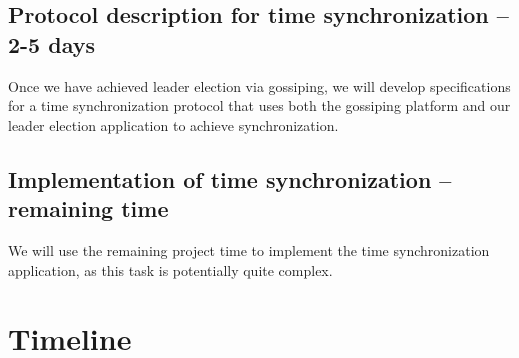 \documentclass[11pt,
  a4paper,
  ngerman,
  BCOR=7mm
]{scrartcl}
\newcommand*{\ExtractCoordinate}[1]{\path (#1); \pgfgetlastxy{\XCoord}{\YCoord};}%
\begin{document}
\subsection*{Protocol description for time synchronization -- 2-5 days}
\label{sub:protocol_time_synch}
Once we have achieved leader election via gossiping, we will develop
specifications for a time synchronization protocol that uses both the
gossiping platform and our leader election application to achieve
synchronization.

\subsection*{Implementation of time synchronization -- remaining time}
\label{sub:implementation_time_synchronization}
We will use the remaining project time to implement the time
synchronization application, as this task is potentially quite complex.

\newpage

\section*{Timeline}
\label{sec:timeline}
\newcommand{\timeunit}{Weeks}
\pgfmathsetmacro{\timenodewidth}{2cm}
\setcounter{itemnumber}{0}
\newcommand{\lastnode}{n-0}

\newcommand{\timeentry}[2]{%
\stepcounter{itemnumber}
\node[below right,minimum width=\timenodewidth] (n-\theitemnumber) at (\lastnode.south west) {#2};
\node[right] at (n-\theitemnumber.east) {};

\edef\lastnode{n-\theitemnumber}

\expandafter\edef\csname nodetime\theitemnumber \endcsname{#1}
}

\newcommand{\drawtimeline}{%
    \draw[very thick,-latex] (0,0) -- ($(\lastnode.south west)-(\scaleitemseparation,0)+(0,-1)$);
    \ExtractCoordinate{n-\theitemnumber.south}
    \pgfmathsetmacro{\yposition}{\YCoord/28.452755}
    \foreach \x in {1,...,\theitemnumber}
    {   \pgfmathsetmacro{\timeposition}{\yposition/(\maxtime-\mintime)*\csname nodetime\x \endcsname}
        \draw (0,\timeposition) -- (0.5,\timeposition) -- ($(n-\x.west)-(0.5,0)$) -- (n-\x.west);
    }
    \foreach \x in {0,...,\timeintervals}
    {   \pgfmathsetmacro{\labelposition}{\yposition/(\maxtime-\mintime)*\x}
        \node[left] (label-\x) at (-0.2,\labelposition) {\x\ \timeunit};
        \draw (label-\x.east) -- ++ (0.2,0);
    }   
}
\end{document}
